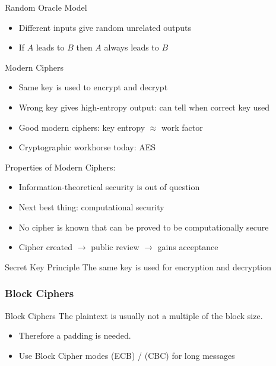 \begin{concept}{Random Oracle Model}
    \begin{itemize}
        \item Different inputs give random unrelated outputs
        \item If $A$ leads to $B$ then $A$ always leads to $B$
    \end{itemize}
\end{concept}


\begin{concept}{Modern Ciphers}
    \begin{itemize}
        \item Same key is used to encrypt and decrypt
        \item Wrong key gives high-entropy output: can tell when correct key used
        \item Good modern ciphers: key entropy $\approx$ work factor
        \item Cryptographic workhorse today: AES
    \end{itemize}
\end{concept}

\begin{remark} Properties of Modern Ciphers:
    \begin{itemize}
        \item Information-theoretical security is out of question
        \item Next best thing: computational security
        \item No cipher is known that can be proved to be computationally secure
        \item Cipher created $\rightarrow$ public review $\rightarrow$ gains acceptance
    \end{itemize}
\end{remark}


\begin{concept}{Secret Key Principle}
    The same key is used for encryption and decryption
\end{concept}

\subsubsection{Block Ciphers}


\begin{definition}{Block Ciphers}
    The plaintext is usually not a multiple of the block size.
    \begin{itemize}
        \item Therefore a padding is needed.
        \item Use Block Cipher modes (ECB) / (CBC) for long messages
    \end{itemize}
\end{definition}


